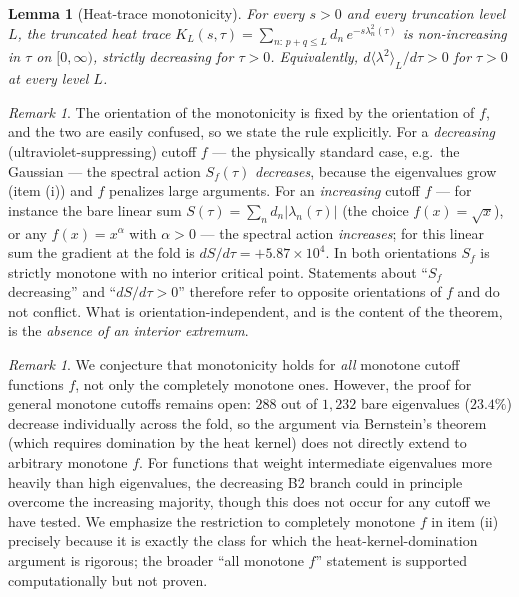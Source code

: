 \documentclass[12pt]{article}
\newtheorem{lemma}[theorem]{Lemma}
\theoremstyle{definition}
\theoremstyle{remark}
\newtheorem{remark}[theorem]{Remark}
\begin{document}
\begin{lemma}[Heat-trace monotonicity]\label{lem:trace-mono}
For every $s>0$ and every truncation level $L$, the truncated heat
trace $K_L(s,\tau) = \sum_{n: \, p+q \leq L} d_n\, e^{-s\lambda_n^2(\tau)}$
is non-increasing in $\tau$ on $[0,\infty)$, strictly decreasing for
$\tau>0$.  Equivalently, $d\langle\lambda^2\rangle_L/d\tau > 0$ for
$\tau>0$ at every level $L$.
\end{lemma}

\begin{remark}\label{rem:sign-convention}
The orientation of the monotonicity is fixed by the orientation of
$f$, and the two are easily confused, so we state the rule explicitly.
For a \emph{decreasing} (ultraviolet-suppressing) cutoff $f$ --- the
physically standard case, e.g.\ the Gaussian --- the spectral action
$S_f(\tau)$ \emph{decreases}, because the eigenvalues grow (item (i))
and $f$ penalizes large arguments.  For an \emph{increasing} cutoff
$f$ --- for instance the bare linear sum $S(\tau) = \sum_n d_n
|\lambda_n(\tau)|$ (the choice $f(x) = \sqrt{x}$), or any $f(x) =
x^\alpha$ with $\alpha>0$ --- the spectral action \emph{increases};
for this linear sum the gradient at the fold is $dS/d\tau = +5.87
\times 10^{4}$.  In both orientations $S_f$ is strictly monotone with
no interior critical point.  Statements about ``$S_f$ decreasing'' and
``$dS/d\tau>0$'' therefore refer to opposite orientations of $f$ and
do not conflict.  What is orientation-independent, and is the content
of the theorem, is the \emph{absence of an interior extremum}.
\end{remark}

\begin{remark}\label{rem:general-monotone-conjecture}
We conjecture that monotonicity holds for \emph{all} monotone cutoff
functions $f$, not only the completely monotone ones.  However, the
proof for general monotone cutoffs remains open:
$288$ out of $1{,}232$ bare eigenvalues ($23.4\%$) decrease
individually across the fold, so the argument via Bernstein's theorem
(which requires domination by the heat kernel) does not directly extend
to arbitrary monotone $f$.  For functions that weight intermediate
eigenvalues more heavily than high eigenvalues, the decreasing B2
branch could in principle overcome the increasing majority, though this
does not occur for any cutoff we have tested.  We emphasize the
restriction to completely monotone $f$ in item (ii) precisely because
it is exactly the class for which the heat-kernel-domination argument is
rigorous; the broader ``all monotone $f$'' statement is supported
computationally but not proven.
\end{remark}
\end{document}
